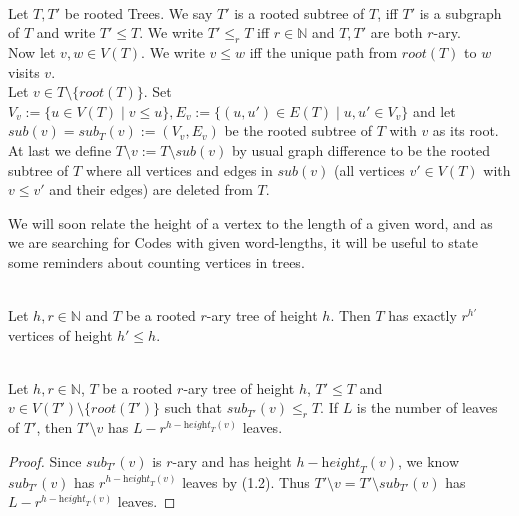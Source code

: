 \documentclass[12pt]{article}
\newcommand{\he}[0]{\textit{height}}
\newcommand{\ro}[0]{\textit{root}}
\newcommand{\SUB}[0]{\textit{sub}}
\newenvironment{statement3}[3]{\begin{trivlist}
\item[\hskip \labelsep {\bfseries #1}\hskip \labelsep {\bfseries #2} {#3}\textbf{.}]}{\end{trivlist}}
\begin{document}
\begin{statement3}{(1.1)}{Definition}{(Subtrees and Ordering)}\strut\\[2pt]
    Let $T, T'$ be rooted Trees. We say $T'$ is a rooted subtree of $T$, iff $T'$ is a subgraph of $T$ and write
    $T' \leq T$. We write $T' \leq_r T$ iff $r \in \mathbb{N}$ and $T,T'$ are both $r$-ary.\\
    Now let $v,w \in V(T)$. We write $v \leq w$ iff the unique path from $\ro(T)$ to $w$ visits $v$.\\
    Let $v \in T \setminus \{\ro(T)\}$. Set
    $V_v := \{u \in V(T) \mid v \leq u\}, E_v := \{(u,u') \in E(T) \mid u,u' \in V_v\}$
    and let $\SUB(v) = \SUB_T(v) := (V_v, E_v)$ be the rooted subtree of $T$ with $v$ as its root.\\
    At last we define $T \setminus v := T \setminus \SUB(v)$ by usual graph difference to be the rooted subtree of $T$
    where all vertices and edges in $\SUB(v)$ (all vertices $v' \in V(T)$ with $v \leq v'$ and their edges)
    are deleted from $T$.
\end{statement3}

\newpage

We will soon relate the height of a vertex to the length of a given word, and as we are searching for Codes
with given word-lengths, it will be useful to state some reminders about counting vertices in trees.

\begin{statement3}{(1.2)}{Reminder}{(Number of vertices of some height in rooted r-ary Trees)}\strut\\[2pt]
    Let $h,r \in \mathbb{N}$ and $T$ be a rooted $r$-ary tree of height $h$.
    Then $T$ has exactly $r^{h'}$ vertices of height $h' \leq h$.
\end{statement3}

\begin{statement3}{(1.3)}{Corollary}{(Number of Leaves of $T \setminus v$)}\strut\\[2pt]
    Let $h,r \in \mathbb{N}$, $T$ be a rooted $r$-ary tree of height $h$, $T' \leq T$ and
    $v \in V(T') \setminus \{\ro(T')\}$ such that $\SUB_{T'}(v) \leq_r T$.
    If $L$ is the number of leaves of $T'$, then $T' \setminus v$ has $L - r^{h - \he_T(v)}$ leaves.

    \begin{proof}
        Since $\SUB_{T'}(v)$ is $r$-ary and has height $h - \he_T(v)$, we know $\SUB_{T'}(v)$ has
        $r^{h- \he_T(v)}$ leaves by (1.2).
        Thus $T' \setminus v = T' \setminus \SUB_{T'}(v)$ has $L - r^{h-\he_T(v)}$ leaves.
    \end{proof}
\end{statement3}
\end{document}
